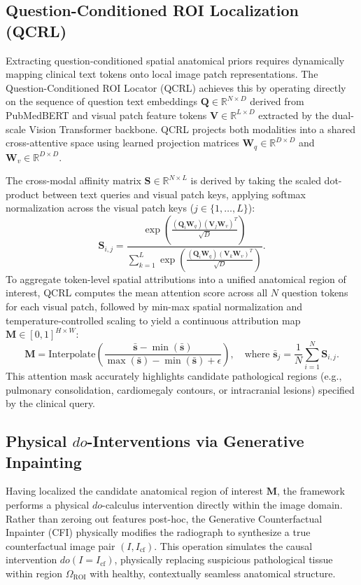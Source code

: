 \documentclass[journal,twoside,web]{ieeecolor}
\begin{document}
\subsection{Question-Conditioned ROI Localization (QCRL)}
Extracting question-conditioned spatial anatomical priors requires dynamically mapping clinical text tokens onto local image patch representations. The Question-Conditioned ROI Locator (QCRL) achieves this by operating directly on the sequence of question text embeddings $\mathbf{Q} \in \mathbb{R}^{N \times D}$ derived from PubMedBERT and visual patch feature tokens $\mathbf{V} \in \mathbb{R}^{L \times D}$ extracted by the dual-scale Vision Transformer backbone. QCRL projects both modalities into a shared cross-attentive space using learned projection matrices $\mathbf{W}_q \in \mathbb{R}^{D \times D}$ and $\mathbf{W}_v \in \mathbb{R}^{D \times D}$.

The cross-modal affinity matrix $\mathbf{S} \in \mathbb{R}^{N \times L}$ is derived by taking the scaled dot-product between text queries and visual patch keys, applying softmax normalization across the visual patch keys ($j \in \{1,\dots,L\}$):
\begin{equation}
\mathbf{S}_{i, j} = \frac{\exp\left( \frac{(\mathbf{Q}_i \mathbf{W}_q) (\mathbf{V}_j \mathbf{W}_v)^T}{\sqrt{D}} \right)}{\sum_{k=1}^L \exp\left( \frac{(\mathbf{Q}_i \mathbf{W}_q) (\mathbf{V}_k \mathbf{W}_v)^T}{\sqrt{D}} \right)}.
\label{eq:cross_attn}
\end{equation}
To aggregate token-level spatial attributions into a unified anatomical region of interest, QCRL computes the mean attention score across all $N$ question tokens for each visual patch, followed by min-max spatial normalization and temperature-controlled scaling to yield a continuous attribution map $\mathbf{M} \in [0, 1]^{H \times W}$:
\begin{equation}
\mathbf{M} = \text{Interpolate}\left( \frac{\bar{\mathbf{s}} - \min(\bar{\mathbf{s}})}{\max(\bar{\mathbf{s}}) - \min(\bar{\mathbf{s}}) + \epsilon} \right), \quad \text{where } \bar{\mathbf{s}}_j = \frac{1}{N} \sum_{i=1}^N \mathbf{S}_{i, j}.
\label{eq:spatial_mask}
\end{equation}
This attention mask accurately highlights candidate pathological regions (e.g., pulmonary consolidation, cardiomegaly contours, or intracranial lesions) specified by the clinical query.

\subsection{Physical $do$-Interventions via Generative Inpainting}
Having localized the candidate anatomical region of interest $\mathbf{M}$, the framework performs a physical $do$-calculus intervention directly within the image domain. Rather than zeroing out features post-hoc, the Generative Counterfactual Inpainter (CFI) physically modifies the radiograph to synthesize a true counterfactual image pair $(I, I_{\text{cf}})$. This operation simulates the causal intervention $do(I = I_{\text{cf}})$, physically replacing suspicious pathological tissue within region $\Omega_{\text{ROI}}$ with healthy, contextually seamless anatomical structure.
\end{document}

